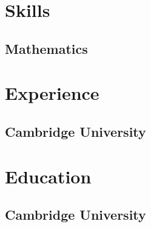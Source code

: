 \documentclass[11pt, a4paper]{notunprofessional}
\begin{document}
\section{Skills}
\subsection{Mathematics}
\section{Experience}
\subsection{Cambridge University}
\section{Education}
\subsection{Cambridge University}
\end{document}
